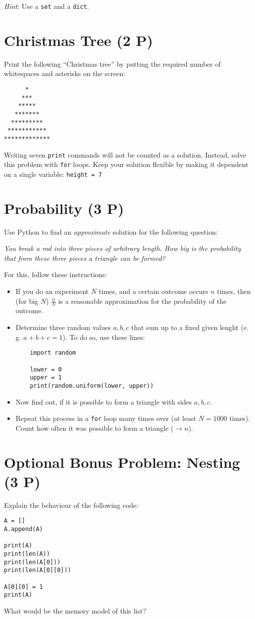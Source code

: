 \documentclass[
	ngerman,
	fontsize=10pt,
	parskip=half,
	titlepage=true,
	DIV=12
]{scrartcl}
\newcommand*{\inPy}[1]{\texttt{#1}}
\newcommand*{\eg}{e.\,g. }
\begin{document}
\emph{Hint}: Use a \inPy{set} and a \inPy{dict}.


\section{Christmas Tree (2 P)}
Print the following \enquote{Christmas tree} by putting the required number of whitespaces and asterisks on the screen:
\begin{verbatim}
      *
     ***
    *****
   *******
  *********
 ***********
*************
\end{verbatim}

Writing seven \inPy{print} commands will not be counted as a solution. Instead, solve this problem with \inPy{for} loops. Keep your solution flexible by making it dependent on a single variable:
\texttt{height = 7}


\section{Probability (3 P)}
Use Python to find an \emph{approximate} solution for the following question:
\begin{center}
	\emph{You break a rod into three pieces of arbitrary length. How big is the probability that from these three pieces a triangle can be formed?}
\end{center}

For this, follow these instructions:
\begin{itemize}
\item If you do an experiment $N$ times, and a certain outcome occurs $n$ times, then (for big $N$) $\frac{n}{N}$ is a reasonable approximation for the probability of
	the outcome.
\item Determine three random values $a, b, c$ that sum up to a fixed given lenght (\eg $a+b+c=1$). To do so, use these lines:
	\begin{verbatim}
	import random
	
	lower = 0
	upper = 1
	print(random.uniform(lower, upper))
	\end{verbatim}
\item Now find out, if it is possible to form a triangle with sides $a, b, c$.
\item Repeat this process in a \inPy{for} loop many times over (at least $N=1000$ times). Count how often it was possible to form a triangle ($\rightarrow n$).
\end{itemize}


\section*{Optional Bonus Problem: Nesting (3 P)}
Explain the behaviour of the following code:

\begin{verbatim}
A = []
A.append(A)

print(A)
print(len(A))
print(len(A[0]))
print(len(A[0][0]))

A[0][0] = 1
print(A)
\end{verbatim}

What would be the memory model of this list?
\end{document}
